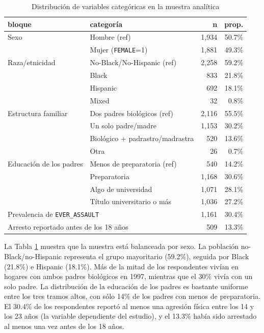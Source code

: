\documentclass[11pt]{article}
\begin{document}
\begin{table}[H]
\centering
\caption{Distribución de variables categóricas en la muestra analítica}
\label{tab:tabla-categoricas}
\small
\begin{tabular}{llrr}
\toprule
bloque & categoría & n & prop. \\
\midrule
Sexo & Hombre (ref) & 1,934 & 50.7\% \\
 & Mujer (\texttt{FEMALE}=1) & 1,881 & 49.3\% \\
Raza/etnicidad & No-Black/No-Hispanic (ref) & 2,258 & 59.2\% \\
 & Black & 833 & 21.8\% \\
 & Hispanic & 692 & 18.1\% \\
 & Mixed & 32 & 0.8\% \\
Estructura familiar & Dos padres biológicos (ref) & 2,116 & 55.5\% \\
 & Un solo padre/madre & 1,153 & 30.2\% \\
 & Biológico + padrastro/madrastra & 520 & 13.6\% \\
 & Otra & 26 & 0.7\% \\
Educación de los padres & Menos de preparatoria (ref) & 540 & 14.2\% \\
 & Preparatoria & 1,168 & 30.6\% \\
 & Algo de universidad & 1,071 & 28.1\% \\
 & Título universitario o más & 1,036 & 27.2\% \\
\midrule
\multicolumn{2}{l}{Prevalencia de \texttt{EVER\_ASSAULT}} & 1,161 & 30.4\% \\
\multicolumn{2}{l}{Arresto reportado antes de los 18 años} & 509 & 13.3\% \\
\bottomrule
\end{tabular}
\end{table}

La Tabla \ref{tab:tabla-categoricas} muestra que la muestra está balanceada por sexo. La población no-Black/no-Hispanic representa el grupo mayoritario (59.2\%), seguida por Black (21.8\%) e Hispanic (18.1\%). Más de la mitad de los respondentes vivían en hogares con ambos padres biológicos en 1997, mientras que el 30\% vivía con un solo padre. La distribución de la educación de los padres es bastante uniforme entre los tres tramos altos, con sólo 14\% de los padres con menos de preparatoria. El 30.4\% de los respondentes reportó al menos una agresión física entre los 14 y los 23 años (la variable dependiente del estudio), y el 13.3\% había sido arrestado al menos una vez antes de los 18 años.
\end{document}
